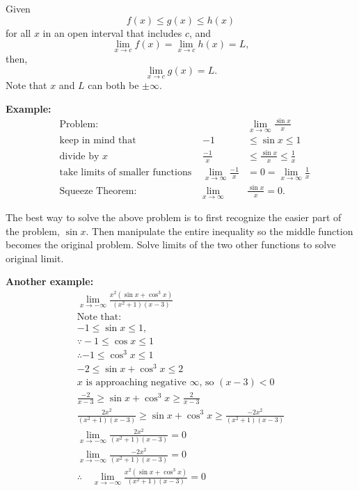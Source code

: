 \documentclass[12pt]{article}
\begin{document}
            \noindent Given
            \[ f(x) \le g(x) \le h(x) \]
            for all $x$ in an open interval that includes $c$, and
            \[ \lim_{x \to c} f(x) = \lim_{x \to c} h(x) = L, \]
            then,
            \[ \lim_{x \to c} g(x) = L. \]
            Note that $x$ and $L$ can both be $\pm \infty$.

            \noindent \textbf{Example:}
            \begin{align*}
                &\text{Problem:} &&\lim_{x \to \infty} \frac{\sin{x}}{x} \\[6pt]
                &\text{keep in mind that} &-1 &\le \sin{x} \le 1 \\
                &\text{divide by $x$} &\frac{-1}{x} &\le \frac{\sin{x}}{x} \le \frac{1}{x} \\[6pt]
                &\text{take limits of smaller functions } &\lim_{x \to \infty} \frac{-1}{x} &= 0 = \lim_{x \to \infty} \frac{1}{x} \\[6pt]
                &\text{Squeeze Theorem:} &\lim_{x \to \infty} &\frac{\sin{x}}{x} = 0.
            \end{align*}

            The best way to solve the above problem is to first recognize the easier part of the problem, $\sin{x}$. Then manipulate the entire inequality so the middle function becomes the original problem. Solve limits of the two other functions to solve original limit.

            \noindent \textbf{Another example:}
            \begin{gather*}
                \lim_{x \to -\infty} \frac{x^2(\sin{x} + \cos^{3}{x})}{(x^2+1)(x-3)} \\[8pt]
                \text{Note that:} \\
                -1 \le \sin{x} \le 1, \\
                \because -1 \le \cos{x} \le {1} \\
                \therefore -1 \le \cos^{3}{x} \le 1 \\
                -2 \le \sin{x} + \cos^{3}{x} \le 2 \\[8pt]
                \text{$x$ is approaching negative $\infty$, so $(x-3) < 0$} \\
                \frac{-2}{x-3} \ge \sin{x} + \cos^{3}{x} \ge \frac{2}{x-3} \\[6pt]
                \frac{2x^2}{(x^2+1)(x-3)} \ge \sin{x} + \cos^{3}{x} \ge \frac{-2x^2}{(x^2+1)(x-3)} \\[10pt]
                \lim_{x \to -\infty}\frac{2x^2}{(x^2+1)(x-3)} = 0 \\[6pt]
                \lim_{x \to -\infty}\frac{-2x^2}{(x^2+1)(x-3)} = 0 \\[6pt]
                \therefore \quad \lim_{x \to -\infty} \frac{x^2(\sin{x} + \cos^{3}{x})}{(x^2+1)(x-3)} = 0
            \end{gather*}
\end{document}
